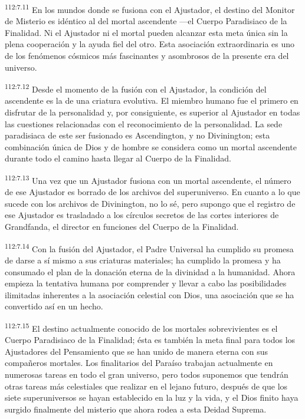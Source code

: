\documentclass[twoside, 11pt]{book}
\begin{document}
\par
\textsuperscript{112:7.11} En los mundos donde se fusiona con el Ajustador, el destino del Monitor de Misterio es idéntico al del mortal ascendente ---el Cuerpo Paradisiaco de la Finalidad. Ni el Ajustador ni el mortal pueden alcanzar esta meta única sin la plena cooperación y la ayuda fiel del otro. Esta asociación extraordinaria es uno de los fenómenos cósmicos más fascinantes y asombrosos de la presente era del universo.

\par
\textsuperscript{112:7.12} Desde el momento de la fusión con el Ajustador, la condición del ascendente es la de una criatura evolutiva. El miembro humano fue el primero en disfrutar de la personalidad y, por consiguiente, es superior al Ajustador en todas las cuestiones relacionadas con el reconocimiento de la personalidad. La sede paradisiaca de este ser fusionado es Ascendington, y no Divinington; esta combinación única de Dios y de hombre se considera como un mortal ascendente durante todo el camino hasta llegar al Cuerpo de la Finalidad.

\par
\textsuperscript{112:7.13} Una vez que un Ajustador fusiona con un mortal ascendente, el número de ese Ajustador es borrado de los archivos del superuniverso. En cuanto a lo que sucede con los archivos de Divinington, no lo sé, pero supongo que el registro de ese Ajustador es trasladado a los círculos secretos de las cortes interiores de Grandfanda, el director en funciones del Cuerpo de la Finalidad.

\par
\textsuperscript{112:7.14} Con la fusión del Ajustador, el Padre Universal ha cumplido su promesa de darse a sí mismo a sus criaturas materiales; ha cumplido la promesa y ha consumado el plan de la donación eterna de la divinidad a la humanidad. Ahora empieza la tentativa humana por comprender y llevar a cabo las posibilidades ilimitadas inherentes a la asociación celestial con Dios, una asociación que se ha convertido así en un hecho.

\par
\textsuperscript{112:7.15} El destino actualmente conocido de los mortales sobrevivientes es el Cuerpo Paradisiaco de la Finalidad; ésta es también la meta final para todos los Ajustadores del Pensamiento que se han unido de manera eterna con sus compañeros mortales. Los finalitarios del Paraíso trabajan actualmente en numerosas tareas en todo el gran universo, pero todos suponemos que tendrán otras tareas más celestiales que realizar en el lejano futuro, después de que los siete superuniversos se hayan establecido en la luz y la vida, y el Dios finito haya surgido finalmente del misterio que ahora rodea a esta Deidad Suprema.
\end{document}
